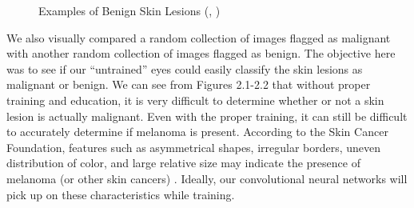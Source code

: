 \documentclass [MAS] {uclathes}
\begin{document}
\begin{figure}[hbt!]
\hspace*{\fill}
\centering
{}\hspace{0.5em}
\hspace{0.5em}
\hspace*{\fill}
\label{fig:ben_examples}
\vspace{-1cm}
\caption{Examples of Benign Skin Lesions (\cite{ISIC}, \cite{ISIC2})}
\end{figure}


We also visually compared a random collection of images flagged as malignant with another random collection of images flagged as benign. The objective here was to see if our ``untrained'' eyes could easily classify the skin lesions as malignant or benign. We can see from Figures 2.1-2.2 that without proper training and education, it is very difficult to determine whether or not a skin lesion is actually malignant. Even with the proper training, it can still be difficult to accurately determine if melanoma is present. According to the Skin Cancer Foundation, features such as asymmetrical shapes, irregular borders, uneven distribution of color, and large relative size may indicate the presence of melanoma (or other skin cancers) \cite{SCF}. Ideally, our convolutional neural networks will pick up on these characteristics while training.
\end{document}
